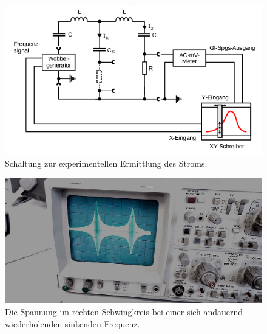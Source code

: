 \begin{figure}
    \centering
    \includegraphics[scale=0.7]{content/Bilder/c.png}
    \caption{Schaltung zur experimentellen Ermittlung des Stroms.}
    \label{fig:Abb3}
    \end{figure}

    \begin{figure}
        \centering
        \includegraphics[scale=0.2]{content/Bilder/Titelbild.jpg}
        \caption{Die Spannung im rechten Schwingkreis bei einer sich andauernd wiederholenden sinkenden Frequenz.}
        \label{fig:Abb4}
        \end{figure}
\label{sec:Durchfuehrung}
